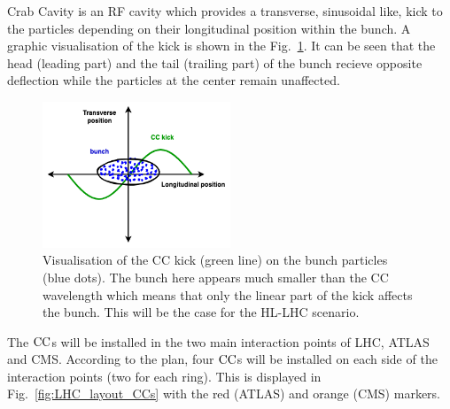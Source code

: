 Crab Cavity is an RF cavity which provides a transverse, sinusoidal like, kick to the particles depending on their longitudinal position within the bunch. A graphic visualisation of the kick is shown in the Fig.~\ref{fig:cc_simple_kick}. It can be seen that the head (leading part) and the tail (trailing part) of the bunch recieve opposite deflection while the particles at the center remain unaffected.

\begin{figure}[!h] %
    \centering         
    \includegraphics[width=0.5\textwidth]{images/introduction/sin_CC_kick_LHC_beams.drawio.png}
        \caption{Visualisation of the CC kick (green line) on the bunch particles (blue dots). The bunch here appears much smaller than the CC wavelength which means that only the linear part of the kick affects the bunch. This will be the case for the HL-LHC scenario.}
        \label{fig:cc_simple_kick}
 \end{figure}

The ${\mathrm{CC}}$s will be installed in the two main interaction points of LHC, ATLAS and CMS. According to the plan, four ${\mathrm{CC}}$s will be installed on each side of the interaction points (two for each ring). This is displayed in Fig.~\ref{fig:LHC_layout_CCs} with the red (ATLAS) and orange (CMS) markers. 

